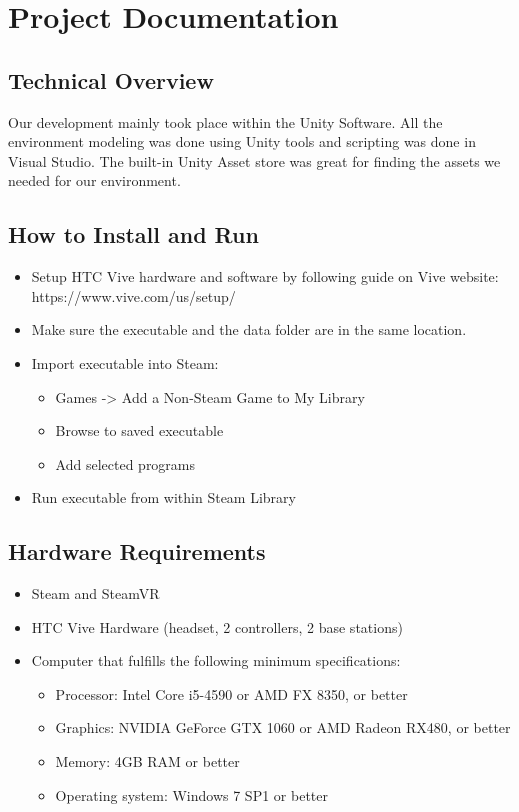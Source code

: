 \documentclass[10pt,journal,compsoc,onecolumn, draftclsnofoot]{IEEEtran}
\begin{document}
\section{Project Documentation}
\subsection{Technical Overview}
Our development mainly took place within the Unity Software. All the environment modeling was done using Unity tools and scripting was done in Visual Studio. The built-in Unity Asset store was great for finding the assets we needed for our environment.

\subsection{How to Install and Run}
\begin{itemize}
  \item Setup HTC Vive hardware and software by following guide on Vive website: https://www.vive.com/us/setup/
  \item Make sure the executable and the data folder are in the same location.
  \item Import executable into Steam:
  \begin{itemize}
    \item Games -> Add a Non-Steam Game to My Library
    \item Browse to saved executable
    \item Add selected programs
  \end{itemize}
  \item Run executable from within Steam Library
\end{itemize}

\subsection{Hardware Requirements}
\begin{itemize}
  \item Steam and SteamVR
  \item HTC Vive Hardware (headset, 2 controllers, 2 base stations)
  \item Computer that fulfills the following minimum specifications:
  \begin{itemize}
    \item Processor: Intel Core i5-4590 or AMD FX 8350, or better
    \item Graphics: NVIDIA GeForce GTX 1060 or AMD Radeon RX480, or better
    \item Memory: 4GB RAM or better
    \item Operating system: Windows 7 SP1 or better
  \end{itemize}
\end{itemize}
\end{document}
